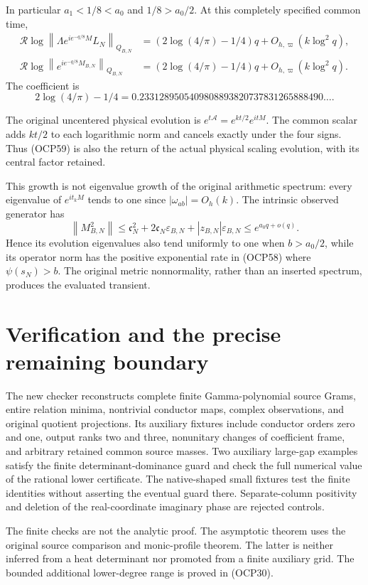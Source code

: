 \documentclass[11pt]{article}
\newcommand{\Rr}{\mathcal R}
\newcommand{\eps}{\varepsilon}
\newcommand{\norm}[1]{\left\lVert#1\right\rVert}
\begin{document}
In particular $a_1<1/8<a_0$ and $1/8>a_0/2$. At this completely specified common time,
\[
 \boxed{\begin{aligned}
 \Rr\log\norm{\Lambda e^{ie^{-q/8}M}L_N}_{Q_{B,N}}
 &=(2\log(4/\pi)-1/4)q+O_{h,\varpi}(k\log^2q),\\
 \Rr\log\norm{e^{ie^{-q/8}M_{B,N}}}_{Q_{B,N}}
 &=(2\log(4/\pi)-1/4)q+O_{h,\varpi}(k\log^2q).
 \end{aligned}}
 \tag{OCP59}
\]
The coefficient is
\[
 2\log(4/\pi)-1/4
 =0.2331289505409808893820737831265888490\ldots.
\]

The original uncentered physical evolution is $e^{t\mathscr A}=e^{kt/2}e^{itM}$. The common scalar adds $kt/2$ to each logarithmic norm and cancels exactly under the four signs. Thus (OCP59) is also the return of the actual physical scaling evolution, with its central factor retained.

This growth is not eigenvalue growth of the original arithmetic spectrum: every eigenvalue of $e^{it_kM}$ tends to one since $|\omega_{ab}|=O_h(k)$. The intrinsic observed generator has
\[
 \norm{M_{B,N}^2}\le
 \mathfrak c_N^2+2\mathfrak c_N\eps_{B,N}
 +|z_{B,N}|\eps_{B,N}\le e^{a_0q+o(q)}.
\]
Hence its evolution eigenvalues also tend uniformly to one when $b>a_0/2$, while its operator norm has the positive exponential rate in (OCP58) where $\psi(s_N)>b$. The original metric nonnormality, rather than an inserted spectrum, produces the evaluated transient.

\section{Verification and the precise remaining boundary}
The new checker reconstructs complete finite Gamma-polynomial source Grams, entire relation minima, nontrivial conductor maps, complex observations, and original quotient projections. Its auxiliary fixtures include conductor orders zero and one, output ranks two and three, nonunitary changes of coefficient frame, and arbitrary retained common source masses. Two auxiliary large-gap examples satisfy the finite determinant-dominance guard and check the full numerical value of the rational lower certificate. The native-shaped small fixtures test the finite identities without asserting the eventual guard there. Separate-column positivity and deletion of the real-coordinate imaginary phase are rejected controls.

The finite checks are not the analytic proof. The asymptotic theorem uses the original source comparison and monic-profile theorem. The latter is neither inferred from a heat determinant nor promoted from a finite auxiliary grid. The bounded additional lower-degree range is proved in (OCP30).
\end{document}
